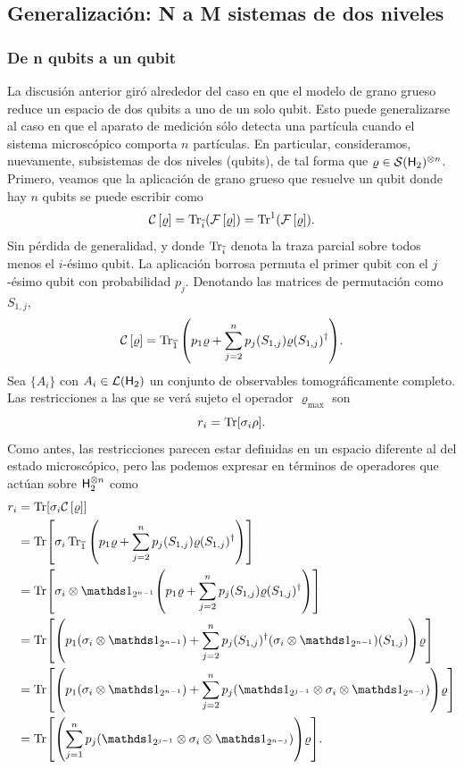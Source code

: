 \subsection{Generalización: N a M sistemas de dos niveles}

\subsubsection{De n qubits a un qubit}
La discusión anterior giró alrededor del caso en que el modelo de grano grueso reduce un espacio de dos qubits a uno de un solo qubit. Esto puede generalizarse al caso en que el aparato de medición sólo detecta una partícula cuando el sistema microscópico comporta $n$ partículas. En particular, consideramos, nuevamente, subsistemas de dos niveles (qubits), de tal forma que $\varrho\in\mathcal{S}({\sf H}_{2})^{\otimes n}$. Primero, veamos que la aplicación de grano grueso que resuelve un qubit donde hay $n$ qubits se puede escribir como
\begin{equation*}
    \mathcal{C}\left[\varrho\right]=\Tr_{\overline{i}}(\mathcal{F}\left[\varrho\right])=\Tr^{1}(\mathcal{F}\left[\varrho\right]).
\end{equation*}
Sin pérdida de generalidad, y donde $\Tr_{\overline{i}}$ denota la traza parcial sobre todos menos el $i$-ésimo qubit. La aplicación borrosa permuta el primer qubit con el $j$-ésimo qubit con probabilidad $p_{j}$. Denotando las matrices de permutación como $S_{1,j}$,
\begin{equation*}
    \mathcal{C}\left[\varrho\right]=\Tr_{\overline{1}}\qty(p_{1}\varrho+\sum_{j=2}^{n}p_{j}(S_{1,j})\varrho(S_{1,j})^{\dagger}).
\end{equation*}
Sea $\{A_{i}\}$ con $A_{i}\in\mathcal{L}({\sf H}_{2})$ un conjunto de observables tomográficamente completo. Las restricciones a las que se verá sujeto el operador $\varrho_{\max}$ son
\begin{equation*}
    r_{i}=\Tr[\sigma_{i}\rho].
\end{equation*}
Como antes, las restricciones parecen estar definidas en un espacio diferente al del estado microscópico, pero las podemos expresar en términos de operadores que actúan sobre ${\sf H}_{2}^{\otimes n}$ como
\begin{align*}
    r_{i}&=\Tr[\sigma_{i}\CG{\varrho}]\\
    &=\Tr[\sigma_{i}\Tr_{\overline{1}}\qty(p_{1}\varrho+\sum_{j=2}^{n}p_{j}(S_{1,j})\varrho(S_{1,j})^{\dagger})]\\
    &=\Tr[\sigma_{i}\otimes\Id_{2^{n-1}}\qty(p_{1}\varrho+\sum_{j=2}^{n}p_{j}(S_{1,j})\varrho(S_{1,j})^{\dagger})]\\
    &=\Tr[\qty(p_{1}(\sigma_{i}\otimes\Id_{2^{n-1}})+\sum_{j=2}^{n}p_{j}(S_{1,j})^{\dagger}(\sigma_{i}\otimes\Id_{2^{n-1}})(S_{1,j}))\varrho]\\
    &=\Tr[\qty(p_{1}(\sigma_{i}\otimes\Id_{2^{n-1}})+\sum_{j=2}^{n}p_{j}(\Id_{2^{j-1}}\otimes\sigma_{i}\otimes\Id_{2^{n-j}}))\varrho]\\
    &=\Tr[\qty(\sum_{j=1}^{n}p_{j}(\Id_{2^{j-1}}\otimes\sigma_{i}\otimes\Id_{2^{n-j}}))\varrho].
\end{align*}
